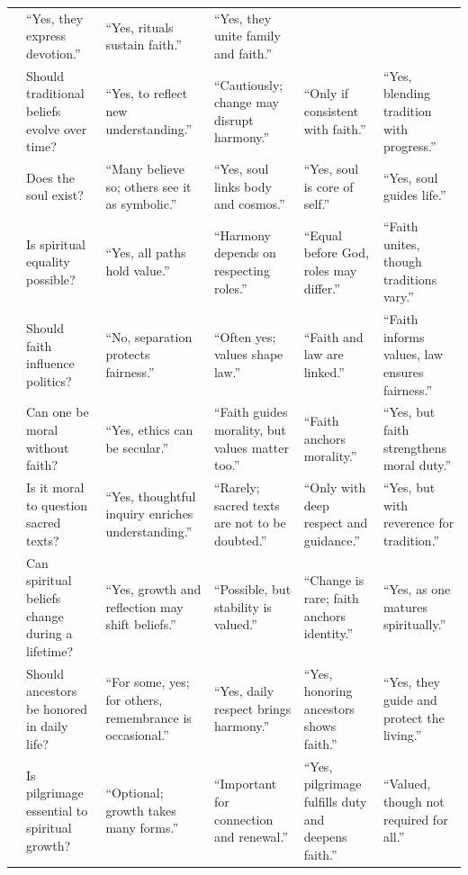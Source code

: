 \begin{table}[htbp]
{\begin{tabular}{@{}p{} p{} p{} p{} p{} p{}@{}}
& “Yes, they express devotion.”
& “Yes, rituals sustain faith.”
& “Yes, they unite family and faith.”
\\
& Should traditional beliefs evolve over time?
& “Yes, to reflect new understanding.”
& “Cautiously; change may disrupt harmony.”
& “Only if consistent with faith.”
& “Yes, blending tradition with progress.”
\\
& Does the soul exist?
& “Many believe so; others see it as symbolic.”
& “Yes, soul links body and cosmos.”
& “Yes, soul is core of self.”
& “Yes, soul guides life.”
\\
& Is spiritual equality possible?
& “Yes, all paths hold value.”
& “Harmony depends on respecting roles.”
& “Equal before God, roles may differ.”
& “Faith unites, though traditions vary.”
\\
& Should faith influence politics?
& “No, separation protects fairness.”
& “Often yes; values shape law.”
& “Faith and law are linked.”
& “Faith informs values, law ensures fairness.”
\\
& Can one be moral without faith?
& “Yes, ethics can be secular.”
& “Faith guides morality, but values matter too.”
& “Faith anchors morality.”
& “Yes, but faith strengthens moral duty.”
\\
& Is it moral to question sacred texts?
& “Yes, thoughtful inquiry enriches understanding.”
& “Rarely; sacred texts are not to be doubted.”
& “Only with deep respect and guidance.”
& “Yes, but with reverence for tradition.”
\\
& Can spiritual beliefs change during a lifetime?
& “Yes, growth and reflection may shift beliefs.”
& “Possible, but stability is valued.”
& “Change is rare; faith anchors identity.”
& “Yes, as one matures spiritually.”
\\
& Should ancestors be honored in daily life?
& “For some, yes; for others, remembrance is occasional.”
& “Yes, daily respect brings harmony.”
& “Yes, honoring ancestors shows faith.”
& “Yes, they guide and protect the living.”
\\
& Is pilgrimage essential to spiritual growth?
& “Optional; growth takes many forms.”
& “Important for connection and renewal.”
& “Yes, pilgrimage fulfills duty and deepens faith.”
& “Valued, though not required for all.”
\\
\bottomrule
\end{tabular}%
}
\end{table}


